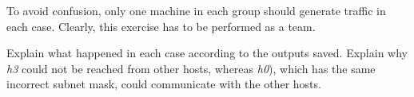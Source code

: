 \documentclass{../UTNetLab}
\begin{document}
To avoid confusion, only one machine in each group should generate traffic in each case.
Clearly, this exercise has to be performed as a team.

\begin{report}
    \item Explain what happened in each case according to the  outputs saved.
    Explain why \textit{h3} could not be reached from other hosts, whereas \textit{h0}), which has the same incorrect subnet mask, could communicate with the other hosts.
\end{report}
\end{document}
